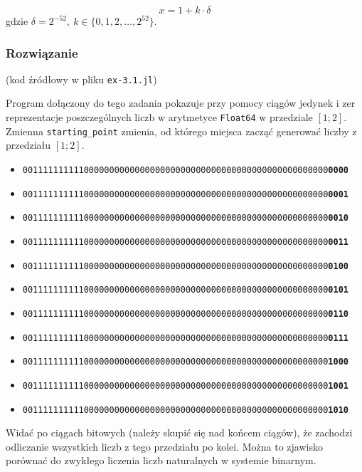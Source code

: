 \documentclass[10pt]{article}
\begin{document}
\begin{equation}\label{z3.1.wyr}
    x = 1 + k\cdot \delta
\end{equation}
gdzie $\delta = 2^{-52},~ k \in \{0,1,2,\dots, 2^{52}\}$.

\subsubsection{Rozwiązanie}
(kod źródłowy w pliku \texttt{ex-3.1.jl})

Program dołączony do tego zadania pokazuje przy pomocy ciągów jedynek i zer reprezentacje poszczególnych liczb w arytmetyce \texttt{Float64} w przedziale $[1;2]$. Zmienna \texttt{starting\_point} zmienia, od którego miejsca zacząć generować liczby z przedziału $[1;2]$.

\begin{itemize}
    \item \texttt{001111111111000000000000000000000000000000000000000000000000\textbf{0000}}
    \item \texttt{001111111111000000000000000000000000000000000000000000000000\textbf{0001}}
    \item \texttt{001111111111000000000000000000000000000000000000000000000000\textbf{0010}}
    \item \texttt{001111111111000000000000000000000000000000000000000000000000\textbf{0011}}
    \item \texttt{001111111111000000000000000000000000000000000000000000000000\textbf{0100}}
    \item \texttt{001111111111000000000000000000000000000000000000000000000000\textbf{0101}}
    \item \texttt{001111111111000000000000000000000000000000000000000000000000\textbf{0110}}
    \item \texttt{001111111111000000000000000000000000000000000000000000000000\textbf{0111}}
    \item \texttt{001111111111000000000000000000000000000000000000000000000000\textbf{1000}}
    \item \texttt{001111111111000000000000000000000000000000000000000000000000\textbf{1001}}
    \item \texttt{001111111111000000000000000000000000000000000000000000000000\textbf{1010}}
\end{itemize}

Widać po ciągach bitowych (należy skupić się nad końcem ciągów), że zachodzi odliczanie wszystkich liczb z tego przedziału po kolei. Można to zjawisko porównać do zwykłego liczenia liczb naturalnych w systemie binarnym.
\end{document}
